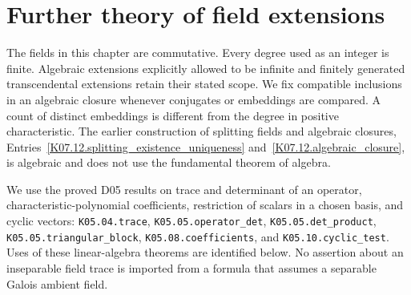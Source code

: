 \chapter{Further theory of field extensions}\label{chap:M07.20}

The fields in this chapter are commutative. Every degree used as an integer is finite. Algebraic extensions explicitly allowed to be infinite and finitely generated transcendental extensions retain their stated scope. We fix compatible inclusions in an algebraic closure whenever conjugates or embeddings are compared. A count of distinct embeddings is different from the degree in positive characteristic. The earlier construction of splitting fields and algebraic closures, Entries~\ref{K07.12.splitting_existence_uniqueness} and~\ref{K07.12.algebraic_closure}, is algebraic and does not use the fundamental theorem of algebra.

We use the proved D05 results on trace and determinant of an operator, characteristic-polynomial coefficients, restriction of scalars in a chosen basis, and cyclic vectors: \texttt{K05.04.trace}, \texttt{K05.05.operator\_det}, \texttt{K05.05.det\_product}, \texttt{K05.05.triangular\_block}, \texttt{K05.08.coefficients}, and \texttt{K05.10.cyclic\_test}. Uses of these linear-algebra theorems are identified below. No assertion about an inseparable field trace is imported from a formula that assumes a separable Galois ambient field.

